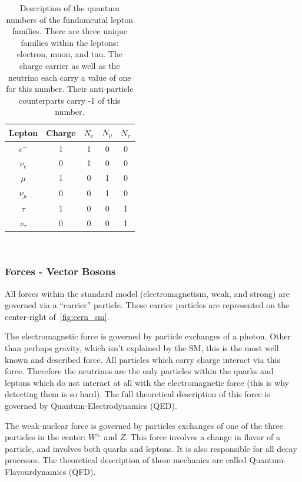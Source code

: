 \begin{table}
\begin{center}
\begin{tabular}{||c c c c c||}
 \hline
 Lepton & Charge & $N_{e}$ & $N_{\mu}$ & $N_{\tau}$ \\ [0.5ex]
 \hline\hline
 $e^{-}$ & 1 & 1 & 0 & 0 \\
 \hline
 $\nu_{e}$ & 0 & 1 & 0 & 0 \\
 \hline
 $\mu$ & 1 & 0 & 1 & 0 \\
 \hline
 $\nu_{\mu}$ & 0 & 0 & 1 & 0 \\
 \hline
 $\tau$ & 1 & 0 & 0 & 1 \\
 \hline
 $\nu_{\tau}$ & 0 & 0 & 0 & 1 \\
 \hline
\end{tabular}
\caption{Description of the quantum numbers of the fundamental lepton families. There are three unique families within the leptons: electron, muon, and tau. The charge carrier as well as the neutrino each carry a value of one for this number. Their anti-particle counterparts carry -1 of this number.}
\end{center}
\end{table}
~\label{table:lepton_qn}

\subsubsection{Forces - Vector Bosons}

All forces within the standard model (electromagnetism, weak, and strong) are governed via a ``carrier'' particle.
These carrier particles are represented on the center-right of~\ref{fig:cern_sm}.

The electromagnetic force is governed by particle exchanges of a photon.
Other than perhaps gravity, which isn't explained by the SM, this is the most well known and described force.
All particles which carry charge  interact via this force.
Therefore the neutrinos are the only particles within the quarks and leptons which do not interact at all with the electromagnetic force (this is why detecting them is so hard).
The full theoretical description of this force is governed by Quantum-Electrodynamics (QED).

The weak-nuclear force is governed by particles exchanges of one of the three particles in the center: $W^{\pm}$ and $Z$.
This force involves a change in flavor of a particle, and involves both quarks and leptons.
It is also responsible for all decay processes.
The theoretical description of these mechanics are called Quantum-Flavourdynamics (QFD).


